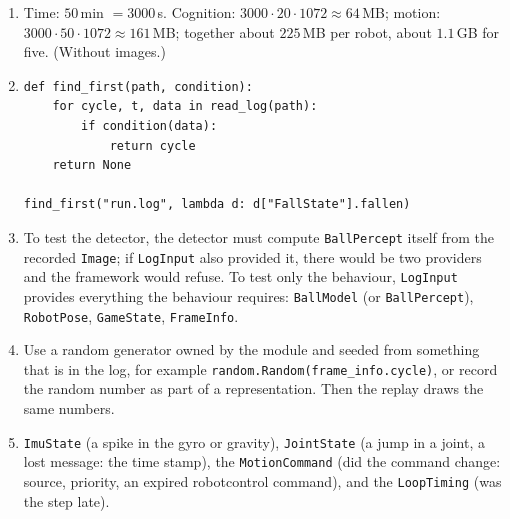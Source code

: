 \begin{enumerate}[label=\textbf{\ansnum.\arabic*}]
  \item Time: $50$\,min $=3000$\,s. Cognition: $3000\cdot20\cdot1072\approx64$\,MB; motion: $3000\cdot50\cdot1072\approx161$\,MB; together about $225$\,MB per robot, about $1.1$\,GB for five. (Without images.)
  \item
\begin{verbatim}
def find_first(path, condition):
    for cycle, t, data in read_log(path):
        if condition(data):
            return cycle
    return None

find_first("run.log", lambda d: d["FallState"].fallen)
\end{verbatim}
  \item To test the detector, the detector must compute \texttt{BallPercept} itself from the recorded \texttt{Image}; if \texttt{LogInput} also provided it, there would be two providers and the framework would refuse. To test only the behaviour, \texttt{LogInput} provides everything the behaviour requires: \texttt{BallModel} (or \texttt{BallPercept}), \texttt{RobotPose}, \texttt{GameState}, \texttt{FrameInfo}.
  \item Use a random generator owned by the module and seeded from something that is in the log, for example \verb!random.Random(frame_info.cycle)!, or record the random number as part of a representation. Then the replay draws the same numbers.
  \item \texttt{ImuState} (a spike in the gyro or gravity), \texttt{JointState} (a jump in a joint, a lost message: the time stamp), the \texttt{MotionCommand} (did the command change: source, priority, an expired robotcontrol command), and the \texttt{LoopTiming} (was the step late).
\end{enumerate}
